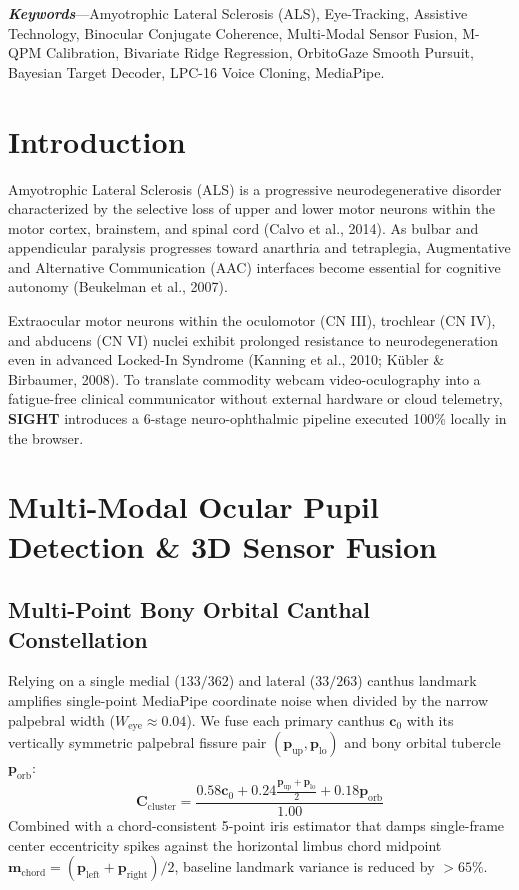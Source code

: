 \documentclass[twocolumn,10pt]{article}
\begin{document}
\textbf{\textit{Keywords}}---Amyotrophic Lateral Sclerosis (ALS), Eye-Tracking, Assistive Technology, Binocular Conjugate Coherence, Multi-Modal Sensor Fusion, M-QPM Calibration, Bivariate Ridge Regression, OrbitoGaze Smooth Pursuit, Bayesian Target Decoder, LPC-16 Voice Cloning, MediaPipe.

\section{Introduction}
Amyotrophic Lateral Sclerosis (ALS) is a progressive neurodegenerative disorder characterized by the selective loss of upper and lower motor neurons within the motor cortex, brainstem, and spinal cord (Calvo et al., 2014). As bulbar and appendicular paralysis progresses toward anarthria and tetraplegia, Augmentative and Alternative Communication (AAC) interfaces become essential for cognitive autonomy (Beukelman et al., 2007).

Extraocular motor neurons within the oculomotor (CN III), trochlear (CN IV), and abducens (CN VI) nuclei exhibit prolonged resistance to neurodegeneration even in advanced Locked-In Syndrome (Kanning et al., 2010; K\"ubler \& Birbaumer, 2008). To translate commodity webcam video-oculography into a fatigue-free clinical communicator without external hardware or cloud telemetry, \textbf{SIGHT} introduces a 6-stage neuro-ophthalmic pipeline executed 100\% locally in the browser.

\section{Multi-Modal Ocular Pupil Detection \& 3D Sensor Fusion}

\subsection{Multi-Point Bony Orbital Canthal Constellation}
Relying on a single medial ($133/362$) and lateral ($33/263$) canthus landmark amplifies single-point MediaPipe coordinate noise when divided by the narrow palpebral width ($W_{\text{eye}} \approx 0.04$). We fuse each primary canthus $\mathbf{c}_0$ with its vertically symmetric palpebral fissure pair $(\mathbf{p}_{\text{up}}, \mathbf{p}_{\text{lo}})$ and bony orbital tubercle $\mathbf{p}_{\text{orb}}$:
\begin{equation}
\mathbf{C}_{\text{cluster}} = \frac{0.58 \mathbf{c}_0 + 0.24 \frac{\mathbf{p}_{\text{up}} + \mathbf{p}_{\text{lo}}}{2} + 0.18 \mathbf{p}_{\text{orb}}}{1.00}
\end{equation}
Combined with a chord-consistent 5-point iris estimator that damps single-frame center eccentricity spikes against the horizontal limbus chord midpoint $\mathbf{m}_{\text{chord}} = (\mathbf{p}_{\text{left}} + \mathbf{p}_{\text{right}})/2$, baseline landmark variance is reduced by $>65\%$.
\end{document}
